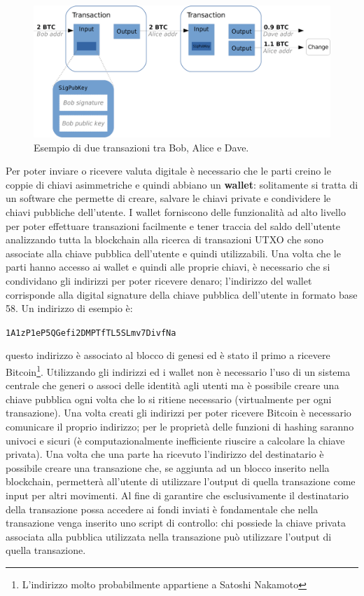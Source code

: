 \begin{figure}
    \centering
    \includegraphics[width=\textwidth]{./images/tx-schema.png}
    \caption{Esempio di due transazioni tra Bob, Alice e Dave.}
\end{figure}
Per poter inviare o ricevere valuta digitale è necessario che le parti creino le coppie di chiavi asimmetriche e quindi abbiano un \textbf{wallet}: solitamente si tratta di un software che permette di creare, salvare le chiavi private e condividere le chiavi pubbliche dell'utente.\newline
I wallet forniscono delle funzionalità ad alto livello per poter effettuare transazioni facilmente e tener traccia del saldo dell'utente analizzando tutta la blockchain alla ricerca di transazioni UTXO che sono associate alla chiave pubblica dell'utente e quindi utilizzabili.\newline
Una volta che le parti hanno accesso ai wallet e quindi alle proprie chiavi, è necessario che si condividano gli indirizzi per poter ricevere denaro; l'indirizzo del wallet corrisponde alla digital signature della chiave pubblica dell'utente in formato base 58.\newline
Un indirizzo di esempio è:
\begin{center}
    \texttt{1A1zP1eP5QGefi2DMPTfTL5SLmv7DivfNa}
\end{center}
questo indirizzo è associato al blocco di genesi ed è stato il primo a ricevere Bitcoin\footnote{L'indirizzo molto probabilmente appartiene a Satoshi Nakamoto}.\newline
Utilizzando gli indirizzi ed i wallet non è necessario l'uso di un sistema centrale che generi o associ delle identità agli utenti ma è possibile creare una chiave pubblica ogni volta che lo si ritiene necessario (virtualmente per ogni transazione).\newline
Una volta creati gli indirizzi per poter ricevere Bitcoin è necessario comunicare il proprio indirizzo; per le proprietà delle funzioni di hashing saranno univoci e sicuri (è computazionalmente inefficiente riuscire a calcolare la chiave privata). Una volta che una parte ha ricevuto l'indirizzo del destinatario è possibile creare una transazione che, se aggiunta ad un blocco inserito nella blockchain, permetterà all'utente di utilizzare l'output di quella transazione come input per altri movimenti.\newline
Al fine di garantire che esclusivamente il destinatario della transazione possa accedere ai fondi inviati è fondamentale che nella transazione venga inserito uno script di controllo: chi possiede la chiave privata associata alla pubblica utilizzata nella transazione può utilizzare l'output di quella transazione.

